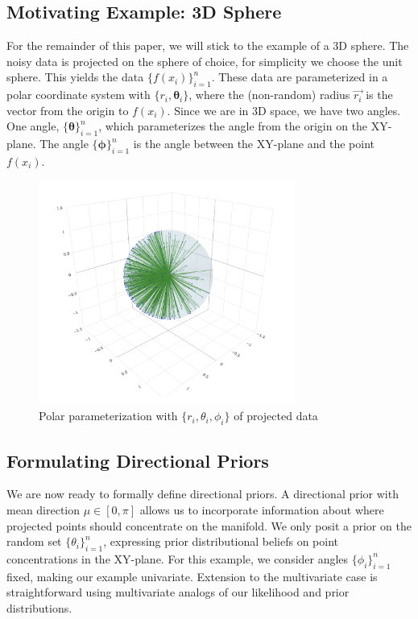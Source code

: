 \documentclass[twoside,11pt]{article}
\begin{document}
\subsection{Motivating Example: 3D Sphere}

For the remainder of this paper, we will stick to the example of a 3D sphere. The noisy data is projected on the sphere of choice, for simplicity we choose the unit sphere. This yields the data $\{f(x_i)\}_{i=1}^n$. These data are parameterized in a polar coordinate system with $\{r_i, \mathbf{\theta}_i\}$, where the (non-random) radius $\vec{r_i}$ is the vector from the origin to $f(x_i)$. Since we are in 3D space, we have two angles. One angle, $\{\mathbf{\theta}\}_{i=1}^n$, which parameterizes the angle from the origin on the XY-plane. The angle $\{\mathbf{\phi}\}_{i=1}^n$ is the angle between the XY-plane and the point $f(x_i)$. 

\begin{figure}[h!]
  \begin{center}
    \includegraphics[width=0.75\textwidth]{../fig/projections-from-origin.png}
  \end{center}
  \caption{Polar parameterization with $\{r_i, \theta_i, \phi_i\}$ of projected data}\label{fig:projections-from-origin}
\end{figure}

\subsection{Formulating Directional Priors}\label{sc:dir-priors}

We are now ready to formally define directional priors. A directional prior with mean direction $\mu \in [0, \pi]$ allows us to incorporate information about where projected points should concentrate on the manifold. We only posit a prior on the random set $\{\theta_i\}_{i=1}^n$, expressing prior distributional beliefs on point concentrations in the XY-plane. For this example, we consider angles $\{\phi_i\}_{i=1}^n$ fixed, making our example univariate. Extension to the multivariate case is straightforward using multivariate analogs of our likelihood and prior distributions.
\end{document}
